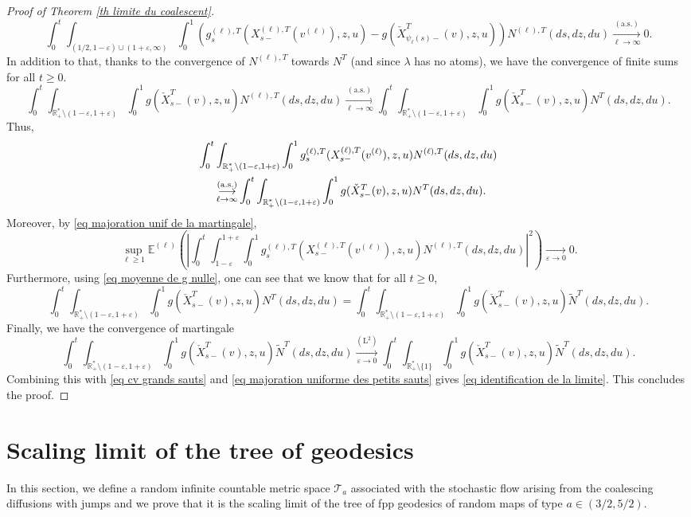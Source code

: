 \documentclass[11pt]{article}
\numberwithin{equation}{section}
\def\vp{\varepsilon}
\def \R{\mathbb {R}}
\def \T{\mathcal{T}}
\def\E{\mathbb{E}}
\begin{document}
\begin{proof}[Proof of Theorem \ref{th limite du coalescent}]
	$$
	\int_0^t \int_{(1/2,1-\vp)\cup(1+\vp, \infty)} \int_0^1
	\left( g^{(\ell),T}_s(X^{(\ell),T}_{s-}(v^{(\ell)}), z, u) 
	-
	g(\check{X}^{T}_{\psi_\ell(s)-}(v), z, u)\right) N^{(\ell),T}(ds,dz,du)
	\mathop{\longrightarrow}\limits_{\ell \to \infty}^{(\mathrm{a.s.})}
	0.
	$$
	In addition to that, thanks to the convergence of $N^{(\ell),T}$ towards $N^T$ (and since $\lambda$ has no atom{s}), we have the convergence of finite sums for all $t \ge 0$.
	$$
	\int_0^t \int_{\R^*_+\setminus(1-\vp,1+\vp)}\int_0^1 g(\check{X}^T_{s-}(v), z,u) N^{(\ell),T}(ds,dz,du)
	\mathop{\longrightarrow}\limits_{\ell \to \infty}^{(\mathrm{a.s.})}
	\int_0^t \int_{\R^*_+\setminus(1-\vp,1+\vp)}\int_0^1 g(\check{X}^T_{s-}(v), z,u) N^T(ds,dz,du).
	$$
	Thus, 
	\begin{align}
	\int_0^t &\int_{\R^*_+\setminus(1-\vp,1+\vp)}\int_0^1 g_s^{(\ell),T}({X}^{(\ell),T}_{s-}(v^{(\ell)}), z,u) N^{(\ell),T}(ds,dz,du)\notag\\
	&\mathop{\longrightarrow}\limits_{\ell \to \infty}^{(\mathrm{a.s.})}
	\int_0^t \int_{\R^*_+\setminus(1-\vp,1+\vp)}\int_0^1 g(\check{X}^T_{s-}(v), z,u) N^T(ds,dz,du).\label{eq cv grands sauts}
	\end{align}
	Moreover, by \eqref{eq majoration unif de la martingale}, 
	\begin{equation}\label{eq majoration uniforme des petits sauts}
	\sup_{\ell\ge 1} \E^{(\ell)} \left( 
	\left\vert
	\int_0^t \int_{1-\vp}^{1+\vp} \int_0^1
	g^{(\ell),T}_s(X^{(\ell),T}_{s-}(v^{(\ell)}), z,u) N^{(\ell),T}(ds,dz,du)
	\right\vert^2\right)
	\mathop{\longrightarrow}\limits_{\vp \to 0} 0.
	\end{equation}
	{Furthermore}, using \eqref{eq moyenne de g nulle}, one can see that 
	we know that for all $t\ge 0$,
	$$
	\int_0^t \int_{\R^*_+\setminus(1-\vp,1+\vp)}\int_0^1 g(\check{X}^T_{s-}(v), z,u) N^T(ds,dz,du)=
	\int_0^t \int_{\R^*_+\setminus(1-\vp,1+\vp)}\int_0^1 g(\check{X}^T_{s-}(v), z,u) \widetilde{N}^T(ds,dz,du).
	$$
	Finally, we have the convergence of martingale
	$$
	\int_0^t \int_{\R^*_+\setminus(1-\vp,1+\vp)}\int_0^1 g(\check{X}^T_{s-}(v), z,u) \widetilde{N}^T(ds,dz,du)
	\mathop{\longrightarrow}\limits_{\vp \to 0}^{(\mathrm{L}^2)}
	\int_0^t \int_{\R^*_+\setminus\{1\}}\int_0^1 g(\check{X}^T_{s-}(v), z,u) \widetilde{N}^T(ds,dz,du).
	$$
	Combining this with \eqref{eq cv grands sauts} and \eqref{eq majoration uniforme des petits sauts} gives \eqref{eq identification de la limite}. This concludes the proof.
\end{proof}

\section{Scaling limit of the tree of geodesics}\label{section arbre geodesiques}
In this section, we define a random infinite countable metric space $\T_a$ associated with the stochastic flow arising from the coalescing diffusions with jumps and we prove that it is the scaling limit of the tree of fpp geodesics of random maps of type $a \in (3/2,5/2)$. 
\end{document}
